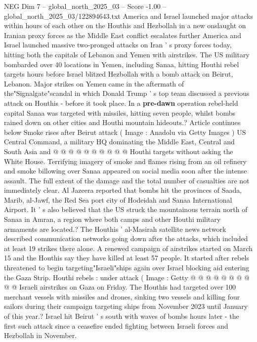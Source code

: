 \begin{textsample}{NEG Dim 7 – global\_north\_2025\_03 – Score -1.00 – global\_north\_2025\_03/122894643.txt}  \label{ex:f7_neg_130}
America and Israel launched major attacks within hours of each other on the Houthis and Hezbollah in a new onslaught on Iranian proxy forces as the Middle East conflict escalates further America and Israel launched massive two-pronged attacks on Iran ' s proxy forces today, hitting both the capitals of Lebanon and Yemen with airstrikes.
The US military bombarded over 40 locations in Yemen, including Sanaa, hitting Houthi rebel targets hours before Israel blitzed Hezbollah with a bomb attack on Beirut, Lebanon.
Major strikes on Yemen came in the aftermath of the"Signalgate"scandal in which Donald Trump ' s top team discussed a previous attack on Houthis - before it took place.
In a \textbf{pre-dawn} operation rebel-held capital Sanaa was targeted with missiles, hitting seven people, whilst bombs rained down on other cities and Houthi mountain hideouts.?
Article continues below Smoke rises after Beirut attack ( Image : Anadolu via Getty Images ) US Central Command, a military HQ dominating the Middle East, Central and South Asia and @ @ @ @ @ @ @ @ @ @ Houthi targets without asking the White House.
Terrifying imagery of smoke and flames rising from an oil refinery and smoke billowing over Sanaa appeared on social media soon after the intense assault.
The full extent of the damage and the total number of casualties are not immediately clear.
Al Jazeera reported that bombs hit the provinces of Saada, Marib, al-Jawf, the Red Sea port city of Hodeidah and Sanaa International Airport.
It ' s also believed that the US struck the mountainous terrain north of Sanaa in Amran, a region where both camps and other Houthi military armaments are located.?
The Houthis ' al-Masirah satellite news network described communication networks going down after the attacks, which included at least 19 strikes there alone.
A renewed campaign of airstrikes started on March 15 and the Houthis say they have killed at least 57 people.
It started after rebels threatened to begin targeting"Israeli"ships again over Israel blocking aid entering the Gaza Strip.
Houthi rebels : under attack ( Image : Getty @ @ @ @ @ @ @ @ @ @ Israeli airstrikes on Gaza on Friday.
The Houthis had targeted over 100 merchant vessels with missiles and drones, sinking two vessels and killing four sailors during their campaign targeting ships from November 2023 until January of this year.?
Israel hit Beirut ' s south with waves of bombs hours later - the first such attack since a ceasefire ended fighting between Israeli forces and Hezbollah in November.

\end{textsample}
